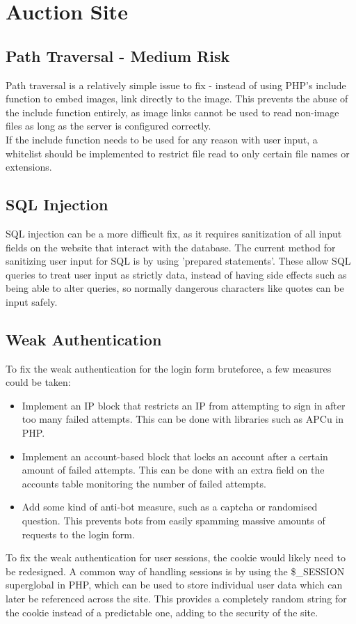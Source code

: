 \documentclass{report}
\begin{document}
\section{Auction Site}
\subsection{Path Traversal - Medium Risk}
Path traversal is a relatively simple issue to fix - instead of using PHP's include function to embed images, link directly to the image. This prevents the abuse of the include function entirely, as image links cannot be used to read non-image files as long as the server is configured correctly.\\ If the include function needs to be used for any reason with user input, a whitelist should be implemented to restrict file read to only certain file names or extensions. 
\subsection{SQL Injection}
SQL injection can be a more difficult fix, as it requires sanitization of all input fields on the website that interact with the database. The current method for sanitizing user input for SQL is by using 'prepared statements'. These allow SQL queries to treat user input as strictly data, instead of having side effects such as being able to alter queries, so normally dangerous characters like quotes can be input safely.
\subsection{Weak Authentication}
To fix the weak authentication for the login form bruteforce, a few measures could be taken:
\begin{itemize}
	\item Implement an IP block that restricts an IP from attempting to sign in after too many failed attempts. This can be done with libraries such as APCu in PHP.
	\item Implement an account-based block that locks an account after a certain amount of failed attempts. This can be done with an extra field on the accounts table monitoring the number of failed attempts.
	\item Add some kind of anti-bot measure, such as a captcha or randomised question. This prevents bots from easily spamming massive amounts of requests to the login form.
\end{itemize}
To fix the weak authentication for user sessions, the cookie would likely need to be redesigned. A common way of handling sessions is by using the \$\_SESSION superglobal in PHP, which can be used to store individual user data which can later be referenced across the site. This provides a completely random string for the cookie instead of a predictable one, adding to the security of the site.
\end{document}
